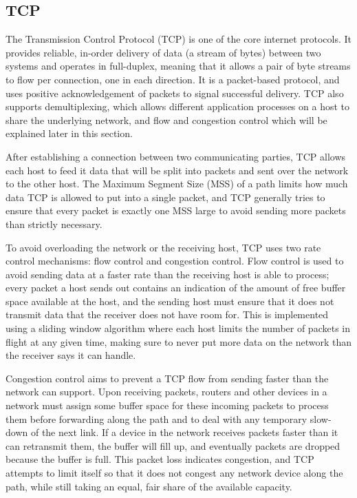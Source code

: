 \subsection{TCP}
\label{sec:bg:tcp}
The Transmission Control Protocol (TCP) is one of the core internet protocols.
It provides reliable, in-order delivery of data (a stream of bytes) between two
systems and operates in full-duplex, meaning that it allows a pair of byte
streams to flow per connection, one in each direction. It is a packet-based
protocol, and uses positive acknowledgement of packets to signal successful
delivery. TCP also supports demultiplexing, which allows different application
processes on a host to share the underlying network, and flow and congestion
control which will be explained later in this section.

After establishing a connection between two communicating parties, TCP allows
each host to feed it data that will be split into packets and sent over the
network to the other host. The Maximum Segment Size (MSS) of a path limits
how much data TCP is allowed to put into a single packet, and TCP generally
tries to ensure that every packet is exactly one MSS large to avoid sending
more packets than strictly necessary.

To avoid overloading the network or the receiving host, TCP uses two rate
control mechanisms: flow control and congestion control. Flow control is used to
avoid sending data at a faster rate than the receiving host is able to process;
every packet a host sends out contains an indication of the amount of free
buffer space available at the host, and the sending host must ensure that it
does not transmit data that the receiver does not have room for. This is
implemented using a sliding window algorithm where each host limits the number
of packets in flight at any given time, making sure to never put more data on
the network than the receiver says it can handle.

Congestion control aims to prevent a TCP flow from sending faster than the
network can support. Upon receiving packets, routers and other devices in a
network must assign some buffer space for these incoming packets to process them
before forwarding along the path and to deal with any temporary slow-down of the
next link. If a device in the network receives packets faster than it can
retransmit them, the buffer will fill up, and eventually packets are dropped
because the buffer is full. This packet loss indicates congestion, and TCP
attempts to limit itself so that it does not congest any network device along
the path, while still taking an equal, fair share of the available capacity.

